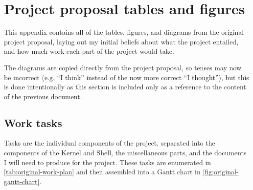 \documentclass{article}
\begin{document}
\clearpage
\section{Project proposal tables and figures}
This appendix contains all of the tables, figures, and diagrams from the
original project proposal, laying out my initial beliefs about what the project
entailed, and how much work each part of the project would take.

The diagrams are copied directly from the project proposal, so tenses may now
be incorrect (e.g. ``I think'' instead of the now more correct ``I thought''),
but this is done intentionally as this section is included only as a reference
to the content of the previous document.

\subsection{Work tasks}
Tasks are the individual components of the project, separated into the
components of the Kernel and Shell, the miscellaneous parts, and the documents
I will need to produce for the project. These tasks are enumerated in
\autoref{tab:original-work-plan} and then assembled into a Gantt chart in
\autoref{fig:original-gantt-chart}.
\end{document}
